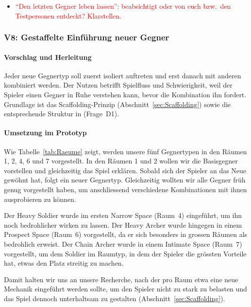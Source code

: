 \documentclass[../Main.tex]{subfiles}
\begin{document}
\begin{itemize}[leftmargin=1.5cm]
    \item \textcolor{red}{\enquote{Den letzten Gegner leben lassen}: beabsichtigt oder von euch bzw.\ den Testpersonen entdeckt? Klarstellen.}
\end{itemize}

\subsubsection{V8: Gestaffelte Einführung neuer Gegner} \label{sec:V8}

\paragraph{Vorschlag und Herleitung}
Jeder neue Gegnertyp soll zuerst isoliert auftreten und erst danach mit anderen kombiniert werden. Der Nutzen betrifft Spielfluss und Schwierigkeit, weil der Spieler einen Gegner in Ruhe verstehen kann, bevor die Kombination ihn fordert. Grundlage ist das Scaffolding-Prinzip (Abschnitt~\ref{sec:Scaffolding}) sowie die entsprechende Struktur in  (Frage~D1).

\paragraph{Umsetzung im Prototyp}
Wie Tabelle~\ref{tab:Raeume} zeigt, werden unsere fünf Gegnertypen in den Räumen 1, 2, 4, 6 und 7 vorgestellt. In den Räumen 1 und 2 wollen wir die Basisgegner vorstellen und gleichzeitig das Spiel erklären. Sobald sich der Spieler an das Neue gewöhnt hat, folgt ein neuer Gegnertyp. Gleichzeitig wollten wir alle Gegner früh genug vorgestellt haben, um anschliessend verschiedene Kombinationen mit ihnen ausprobieren zu können.

Der Heavy Soldier wurde im ersten Narrow Space (Raum~4) eingeführt, um ihn noch bedrohlicher wirken zu lassen. Der Heavy Archer wurde hingegen in einem Prospect Space (Raum~6) vorgestellt, da er sich besonders in grossen Räumen als bedrohlich erweist. Der Chain Archer wurde in einem Intimate Space (Raum~7) vorgestellt, um dem Soldier im Raumtyp, in dem der Spieler die grössten Vorteile hat, etwas den Platz streitig zu machen.

Damit halten wir uns an unsere Recherche, nach der pro Raum etwa eine neue Mechanik eingeführt werden sollte, um den Spieler nicht zu stark zu belasten und das Spiel dennoch unterhaltsam zu gestalten (Abschnitt~\ref{sec:Scaffolding}).
\end{document}

